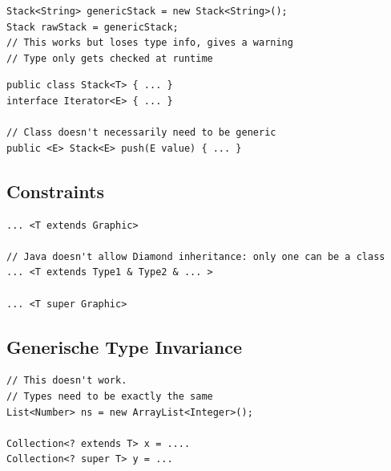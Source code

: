 \begin{multicols*}{4}
	\begin{lstlisting}
Stack<String> genericStack = new Stack<String>();
Stack rawStack = genericStack;
// This works but loses type info, gives a warning
// Type only gets checked at runtime
	\end{lstlisting}

\vspace{5pt}

	\begin{lstlisting}
public class Stack<T> { ... }
interface Iterator<E> { ... }

// Class doesn't necessarily need to be generic
public <E> Stack<E> push(E value) { ... }
	\end{lstlisting}

	\subsection{Constraints}
		\begin{lstlisting}
... <T extends Graphic>

// Java doesn't allow Diamond inheritance: only one can be a class
... <T extends Type1 & Type2 & ... >

... <T super Graphic>
		\end{lstlisting}
	
	\subsection{Generische Type Invariance}
		\begin{lstlisting}
// This doesn't work. 
// Types need to be exactly the same
List<Number> ns = new ArrayList<Integer>();

Collection<? extends T> x = ....
Collection<? super T> y = ...
		\end{lstlisting}


\end{multicols*}

% 

